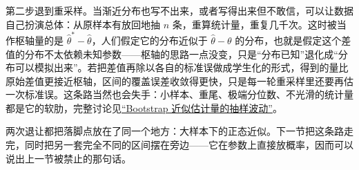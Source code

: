 第二步退到重采样。当渐近分布也写不出来，或者写得出来但不敢信，可以让数据自己扮演总体：从原样本有放回地抽 \(n\) 条，重算统计量，重复几千次。这时被当作枢轴量的是 \(\hat\theta^{*}-\hat\theta\)，人们假定它的分布近似于 \(\hat\theta-\theta\) 的分布，也就是假定这个差值的分布不太依赖未知参数——枢轴的思路一点没变，只是``分布已知''退化成``分布可以模拟出来''。若把差值再除以各自的标准误做成学生化的形式，得到的量比原始差值更接近枢轴，区间的覆盖误差收敛得更快，只是每一轮重采样里还要再估一次标准误。这条路当然也会失手：小样本、重尾、极端分位数、不光滑的统计量都是它的软肋，完整讨论见\hyperref[sec:11-Mathematical-Statistics/06-Resampling-and-Model-Selection/01]{``Bootstrap 近似估计量的抽样波动''}。

两次退让都把落脚点放在了同一个地方：大样本下的正态近似。下一节把这条路走完，同时把另一套完全不同的区间摆在旁边——它在参数上直接放概率，因而可以说出上一节被禁止的那句话。
